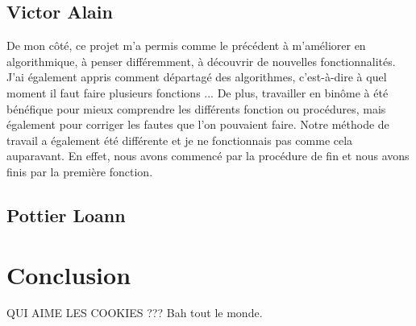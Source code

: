 \documentclass[12pt]{report}
\begin{document}
\subsection{Victor Alain}

De mon côté, ce projet m'a permis comme le précédent à m'améliorer en algorithmique, à penser différemment, à découvrir de nouvelles fonctionnalités. J'ai également appris comment départagé des algorithmes, c'est-à-dire à quel moment il faut faire plusieurs fonctions ... De plus, travailler en binôme à été bénéfique pour mieux comprendre les différents fonction ou procédures, mais également pour corriger les fautes que l'on pouvaient faire. Notre méthode de travail a également été différente et je ne fonctionnais pas comme cela auparavant. En effet, nous avons commencé par la procédure de fin et nous avons finis par la première fonction.

\subsection{Pottier Loann}

\section{Conclusion}

QUI AIME LES COOKIES ??? Bah tout le monde. 
			
\end{document}
